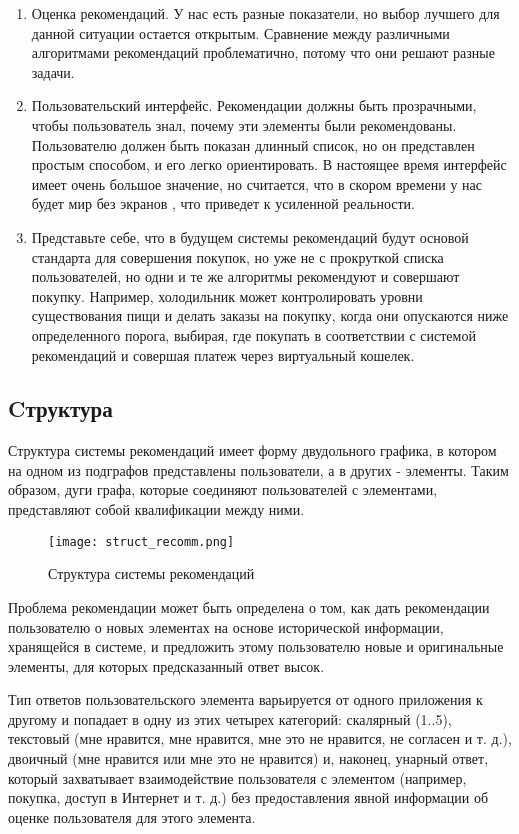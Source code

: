 \begin{enumerate}
\item
Оценка рекомендаций. У нас есть разные показатели, но выбор лучшего для данной ситуации остается открытым. Сравнение между различными алгоритмами рекомендаций проблематично, потому что они решают разные задачи.

\item
Пользовательский интерфейс. Рекомендации должны быть прозрачными, чтобы пользователь знал, почему эти элементы были рекомендованы. Пользователю должен быть показан длинный список, но он представлен простым способом, и его легко ориентировать. В настоящее время интерфейс имеет очень большое значение, но считается, что в скором времени у нас будет мир без экранов \cite{screenless}, что приведет к усиленной реальности.

\item
Представьте себе, что в будущем системы рекомендаций будут основой стандарта для совершения покупок, но уже не с прокруткой списка пользователей, но одни и те же алгоритмы рекомендуют и совершают покупку. Например, холодильник может контролировать уровни существования пищи и делать заказы на покупку, когда они опускаются ниже определенного порога, выбирая, где покупать в соответствии с системой рекомендаций и совершая платеж через виртуальный кошелек.
\end{enumerate}


\subsection{Cтруктура}

Структура системы рекомендаций имеет форму двудольного графика, в котором на одном из подграфов представлены пользователи, а в других - элементы. Таким образом, дуги графа, которые соединяют пользователей с элементами, представляют собой квалификации между ними.


\begin{figure}[h]
  \centering
  \texttt{[image: struct\_recomm.png]}
  \caption{Структура системы рекомендаций}
  \label{image:scheme4}
\end{figure}

Проблема рекомендации может быть определена о том, как дать рекомендации пользователю о новых элементах на основе исторической информации, хранящейся в системе, и предложить этому пользователю новые и оригинальные элементы, для которых предсказанный ответ высок.

Тип ответов пользовательского элемента варьируется от одного приложения к другому и попадает в одну из этих четырех категорий: скалярный (1..5), текстовый (мне нравится, мне нравится, мне это не нравится, не согласен и т. д.), двоичный (мне нравится или мне это не нравится) и, наконец, унарный ответ, который захватывает взаимодействие пользователя с элементом (например, покупка, доступ в Интернет и т. д.) без предоставления явной информации об оценке пользователя для этого элемента.

